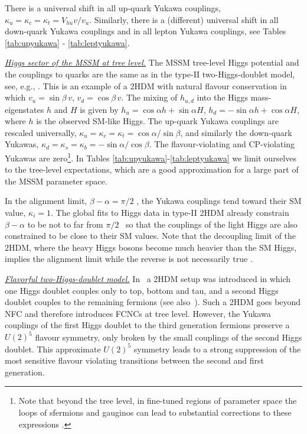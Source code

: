\documentclass[../report.tex]{subfiles}
\begin{document}
There is a universal shift in all up-quark Yukawa couplings, $\kappa_u = \kappa_c = \kappa_t = V_{hu}{v}/{v_u}$. Similarly, there is a (different) universal shift in all down-quark Yukawa couplings and in all lepton Yukawa couplings, see Tables \ref{tab:upyukawa} - \ref{tab:leptyukawa}.

\underline{\it Higgs sector of the MSSM at tree level.}
The MSSM tree-level Higgs potential and the couplings to quarks are
the same as in the type-II two-Higgs-doublet model, see, e.g.,
\cite{Haber:1984rc}. This is an example of a 2HDM with natural flavour
conservation in which $v_u=\sin\beta\, v$, $v_d=\cos\beta\,
v$. The mixing of $h_{u,d}$ into the Higgs mass-eigenstates $h$ and
$H$ is given by $h_u=\cos \alpha h+\sin\alpha H$, $h_d = -\sin\alpha h +\cos\alpha H$,
where $h$ is the observed SM-like Higgs. The up-quark Yukawa couplings are rescaled universally, 
$	\kappa_u = \kappa_c = \kappa_t=\cos\alpha/\sin\beta$, and similarly the down-quark Yukawas, 
	$\kappa_d = \kappa_s = \kappa_b = -\sin\alpha/\cos\beta$.
The flavour-violating and CP-violating Yukawas are zero\footnote{Note that beyond the tree level, in fine-tuned regions of parameter space the loops of sfermions and gauginos can lead to substantial corrections to these expressions \cite{Aloni:2015wvn}.}. In Tables \ref{tab:upyukawa}-\ref{tab:leptyukawa} we limit ourselves to the tree-level expectations, which are a good approximation for a large part of the MSSM parameter space.


In the alignment limit, $\beta-\alpha=\pi/2$ \cite{Gunion:2002zf,Carena:2013ooa,Dev:2014yca,Carena:2014nza,Dev:2015bta,Haber:2015pua,Carena:2015moc}, the Yukawa couplings tend toward their
SM value, $\kappa_i=1$.  The global fits to Higgs data in type-II 2HDM
already constrain $\beta-\alpha$ to be not to far from $\pi/2$~\cite{Carmi:2012in,
  Falkowski:2013dza, Grinstein:2013npa} so that the couplings of the light Higgs are also constrained to be close to their SM values. 
  Note that the decoupling limit of the 2HDM, where the heavy Higgs bosons become much heavier than the SM Higgs, implies the alignment limit while the reverse is not necessarily true \cite{Carena:2013ooa}.

\underline{\it Flavorful two-Higgs-doublet model.}
In~\cite{Altmannshofer:2015esa} a 2HDM setup was introduced in which one Higgs doublet couples only to top, bottom and tau, and a second Higgs doublet couples to the remaining fermions (see also~\cite{Botella:2016krk,Ghosh:2015gpa,Das:1995df,Blechman:2010cs}).
Such a 2HDM goes beyond NFC and therefore introduces FCNCs at tree level. However, the Yukawa couplings
of the first Higgs doublet to the third generation fermions preserve a $U(2)^5$ flavour symmetry, only
broken by the small couplings of the second Higgs doublet. This approximate $U(2)^5$ symmetry
leads to a strong suppression of the most sensitive flavour violating transitions between the second and first generation.
\end{document}
